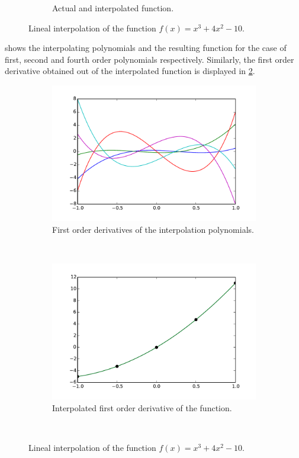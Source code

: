 \begin{figure}[H]
\begin{subfigure}[b]{0.45\textwidth}
		\caption{Actual and interpolated function.}
	\end{subfigure}
\caption{Lineal interpolation of the function $f(x) = {x^3} + 4{x^2} - 10$.}
\label{fig:several interpol}
\end{figure}

 shows the interpolating polynomials and the resulting function for the case of first, second and fourth order polynomials respectively. Similarly, the first order derivative obtained out of the interpolated function is displayed in \cref{fig:first der}. 

\begin{figure}[H]
\centering
	\begin{subfigure}[b]{0.45\textwidth}\qquad
		\includegraphics[width=\textwidth]{deriv2.pdf}
		\caption{First order derivatives of the interpolation polynomials. }
	\end{subfigure}\,
%
	\begin{subfigure}[b]{0.45\textwidth}\qquad
		\includegraphics[width=\textwidth]{firstder.pdf}
		\caption{Interpolated first order derivative of the function.}
	\end{subfigure}\\

\caption{Lineal interpolation of the function $f(x) = {x^3} + 4{x^2} - 10$.}
\label{fig:first der}
\end{figure}

